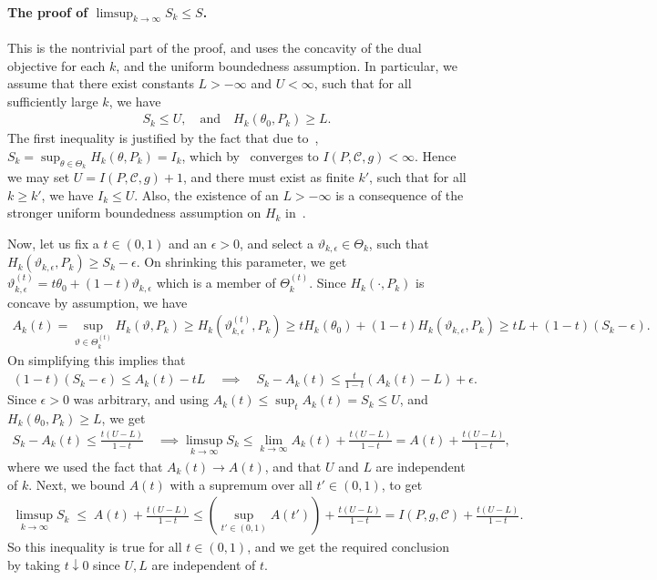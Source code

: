 \documentclass{article}
\theoremstyle{plain}
\theoremstyle{definition}
\newcommand{\lrp}[1]{\left( #1 \right)}
\newcommand{\calC}{\mathcal C}
\newcommand{\qtext}[1]{\quad \text{#1} \quad}
\begin{document}
\paragraph{The proof of $\limsup_{k \to \infty} S_k \leq S$.} This is the nontrivial part of the proof, and uses the concavity of the dual objective for each $k$, and the uniform boundedness assumption. In particular, we assume that there exist constants $L>-\infty$ and $U < \infty$, such that for all sufficiently large $k$, we have 
\begin{align}
    S_k \leq U, \qtext{and} H_k(\theta_0, P_k) \geq L. 
\end{align}
The first inequality is justified by the fact that due to~, $S_k = \sup_{\theta \in \Theta_k} H_k(\theta, P_k) = I_k$, which by~ converges to $I(P, \calC, g) < \infty$. Hence  we may set $U = I(P, \calC, g) + 1$, and there must exist as finite $k'$, such that for all $k \geq k'$, we have $I_k \leq U$. Also, the existence of an $L> -\infty$ is a consequence of the stronger uniform boundedness assumption on $H_k$ in~. 

Now, let us fix a $t\in (0,1)$ and an $\epsilon >0$, and select a $\vartheta_{k,\epsilon} \in \Theta_k$, such that $H_k(\vartheta_{k,\epsilon}, P_k) \geq S_k - \epsilon$. On shrinking this parameter, we get $\vartheta^{(t)}_{k, \epsilon} = t \theta_0 + (1-t) \vartheta_{k,\epsilon}$ which is a member of $\Theta^{(t)}_k$. Since $H_k(\cdot, P_k)$ is concave by assumption, we have 
\begin{align}
    A_k(t) = \sup_{\vartheta \in \Theta_k^{(t)}} H_k(\vartheta, P_k) \geq H_k(\vartheta^{(t)}_{k,\epsilon}, P_k) \geq t H_k(\theta_0) + (1-t) H_k(\vartheta_{k, \epsilon}, P_k) \geq t L + (1-t) (S_k - \epsilon). 
\end{align}
On simplifying this implies that 
\begin{align}
    (1-t)(S_k- \epsilon)   \leq A_k(t) - t L \quad \implies \quad S_k - A_k(t) \leq \frac{t}{1-t} \lrp{A_k(t)- L} + \epsilon.  
\end{align}
Since $\epsilon>0$ was arbitrary, and using  $A_k(t) \leq \sup_{t} A_k(t) = S_k \leq U$, and $H_k(\theta_0, P_k) \geq L$, we get
\begin{align}
    S_k - A_k(t) \leq \frac{t(U-L)}{1-t} \quad \implies \limsup_{k \to \infty} S_k \leq \lim_{k \to \infty} A_k(t) + \frac{t (U-L)}{1-t} = A(t) + \frac{t(U-L)}{1-t},
\end{align}
where we used the fact that $A_k(t) \to A(t)$, and that $U$ and $L$ are independent of $k$. Next, we bound $A(t)$ with a supremum over all $t' \in (0,1)$, to get 
\begin{align}
    \limsup_{k \to \infty} S_k \; \leq \; A(t) + \frac{t(U-L)}{1-t} \leq \lrp{\sup_{t' \in (0,1)} A(t')} + \frac{t(U-L)}{1-t} = I(P, g, \calC) + \frac{t(U-L)}{1-t}. 
\end{align}
So this inequality is true for all $t \in (0,1)$, and we get the required conclusion by taking $t \downarrow 0$ since $U, L$ are independent of $t$. 
\end{document}
